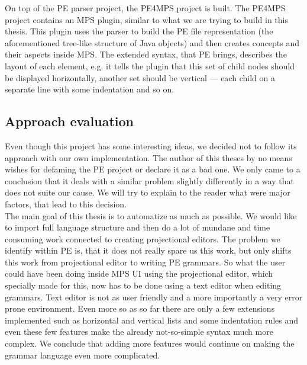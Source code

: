 On top of the PE parser project, the PE4MPS project is built.
The PE4MPS project contains an MPS plugin, similar to what we are trying to build in this thesis.
This plugin uses the parser to build the PE file representation (the aforementioned tree-like structure of Java objects) and then creates concepts and their aspects inside MPS.
The extended syntax, that PE brings, describes the layout of each element, e.g. it tells the plugin that this set of child nodes should be displayed horizontally, another set should be vertical --- each child on a separate line with some indentation and so on.

\subsection{Approach evaluation}
Even though this project has some interesting ideas, we decided not to follow its approach with our own implementation.
The author of this theses by no means wishes for defaming the PE project or declare it as a bad one.
We only came to a conclusion that it deals with a similar problem slightly differently in a way that does not suite our cause.
We will try to explain to the reader what were major factors, that lead to this decision.
\\

The main goal of this thesis is to automatize as much as possible.
We would like to import full language structure and then do a lot of mundane and time consuming work connected to creating projectional editors.
The problem we identify within PE is, that it does not really spare us this work, but only shifts this work from projectional editor to writing PE grammars.
So what the user could have been doing inside MPS UI using the projectional editor, which specially made for this, now has to be done using a text editor when editing grammars.
Text editor is not as user friendly and a more importantly a very error prone environment.
Even more so as so far there are only a few extensions implemented such as horizontal and vertical lists and some indentation rules and even these few features make the already not-so-simple syntax much more complex.
We conclude that adding more features would continue on making the grammar language even more complicated.
\\

